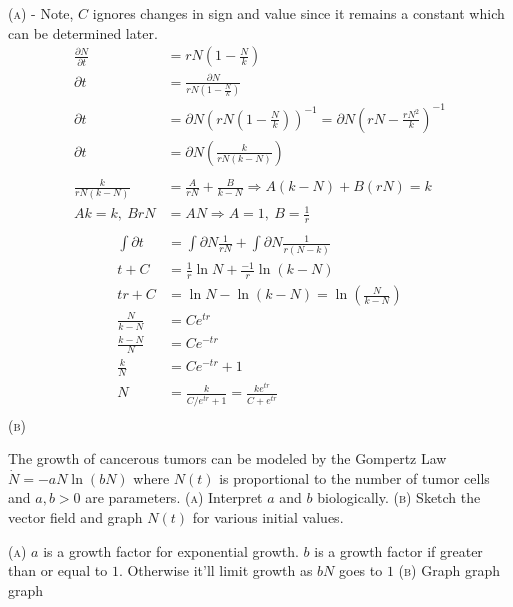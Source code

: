 \documentclass[11pt,answers]{exam}
\begin{document}
\begin{questions}
\begin{solution}
\newline\textsc{(a)} - Note, $C$ ignores changes in sign and value since it remains a constant which can be determined later.
\begin{align*}
\frac{\partial{N}}{\partial{t}} &= rN\left(1 - \frac{N}{k}\right) \\
\partial{t} &= \frac{\partial{N}}{rN\left(1 - \frac{N}{k}\right)} \\
\partial{t} &= \partial{N}\left( rN\left(1 - \frac{N}{k}\right) \right)^{-1} = \partial{N}\left(rN - \frac{rN^2}{k}\right)^{-1} \\
\partial{t} &= \partial{N}\left( \frac{k}{rN(k-N)} \right) \\
\\
\frac{k}{rN(k-N)} &= \frac{A}{rN} + \frac{B}{k-N} \Rightarrow A(k-N) + B(rN) = k \\
Ak = k, ~ BrN &= AN \Rightarrow A = 1, ~ B = \frac{1}{r} \\
\end{align*}
\begin{align*}
\int\partial{t} &= \int\partial{N}\frac{1}{rN} + \int\partial{N}\frac{1}{r(N-k)}\\
t + C &= \frac{1}{r}\ln{N} + \frac{-1}{r}\ln(k-N) \\
tr + C &= \ln{N} - \ln(k-N) = \ln{\left( \frac{N}{k-N} \right)} \\
\frac{N}{k-N} &= Ce^{tr} \\
\frac{k-N}{N} &= Ce^{-tr} \\
\frac{k}{N} &= Ce^{-tr} + 1 \\
N &= \frac{k}{C/e^{tr} + 1} = \frac{ke^{tr}}{C + e^{tr}} \\
\end{align*}
\newline\newline\textsc{(b)}
\end{solution}

\item The growth of cancerous tumors can be modeled by the Gompertz Law $\dot{N} = -aN\ln{(bN)}$ where $N(t)$ is proportional to the number of tumor cells and $a, b > 0$ are parameters.
\newline\textsc{(a)} Interpret $a$ and $b$ biologically.
\newline\textsc{(b)} Sketch the vector field and graph $N(t)$ for various initial values.

\begin{solution}
\newline\textsc{(a)} $a$ is a growth factor for exponential growth.  $b$ is a growth factor if greater than or equal to $1$.  Otherwise it'll limit growth as $bN$ goes to $1$
\newline\newline\textsc{(b)} Graph graph graph
\end{solution}



\end{questions}
\end{document}
